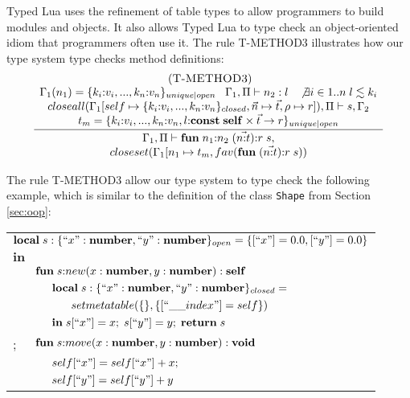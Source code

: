 Typed Lua uses the refinement of table types to allow programmers to
build modules and objects.
It also allows Typed Lua to type check an object-oriented idiom that
programmers often use it.
The rule \textsc{T-METHOD3} illustrates how our type system type checks
method definitions:
\[
\begin{array}{c}
\; (\textsc{T-METHOD3})\\
\dfrac{\begin{array}{c}
       \Gamma_{1}(n_{1}) = \{k_{i}{:}v_{i}, ..., k_{n}{:}v_{n}\}_{unique|open} \;\;\;
       \Gamma_{1}, \Pi \vdash n_{2} : l \;\;\;
       \not \exists i \in 1..n \; l \lesssim k_{i}\\
       closeall(\Gamma_{1}[self \mapsto \{k_{i}{:}v_{i}, ..., k_{n}{:}v_{n}\}_{closed}, \vec{n} \mapsto \vec{t}, \rho \mapsto r]), \Pi \vdash s, \Gamma_{2}\\
       t_{m} = \{k_{i}{:}v_{i}, ..., k_{n}{:}v_{n}, l{:}\mathbf{const} \; \mathbf{self} \times \vec{t} \rightarrow r\}_{unique|open}
       \end{array}}
      {\begin{array}{c}
       \Gamma_{1}, \Pi \vdash \mathbf{fun} \; n_{1}{:}n_{2} \; (\vec{n{:}t}){:}r \; s,\\
       closeset(\Gamma_{1}[n_{1} \mapsto t_{m}, fav(\mathbf{fun} \; (\vec{n{:}t}){:}r \; s))
       \end{array}}
\end{array}
\]

The rule \textsc{T-METHOD3} allow our type system to type check the
following example, which is similar to the definition of the class
\texttt{Shape} from Section \ref{sec:oop}:
\begin{center}
\begin{tabular}{llll}
\multicolumn{4}{l}{$\mathbf{local} \; s:\{``x":\mathbf{number}, ``y":\mathbf{number}\}_{open} = \{ [``x"] = 0.0, [``y"] = 0.0 \}$}\\
\multicolumn{4}{l}{$\mathbf{in}$}\\
& \multicolumn{3}{l}{$\mathbf{fun} \; s{:}new (x:\mathbf{number}, y:\mathbf{number}):\mathbf{self}$}\\
& & \multicolumn{2}{l}{$\mathbf{local} \; s:\{``x":\mathbf{number}, ``y":\mathbf{number}\}_{closed} =$}\\
& & & \multicolumn{1}{l}{$setmetatable(\{\}, \{ [``\string_\string_index"] = self \})$}\\
& & \multicolumn{2}{l}{$\mathbf{in} \; s[``x"] = x; \; s[``y"] = y; \; \mathbf{return} \; s$}\\
; & \multicolumn{3}{l}{$\mathbf{fun} \; s{:}move (x:\mathbf{number}, y:\mathbf{number}):\mathbf{void}$}\\
& & \multicolumn{2}{l}{$self[``x"] = self[``x"] + x;$}\\
& & \multicolumn{2}{l}{$self[``y"] = self[``y"] + y$}
\end{tabular}
\end{center}

